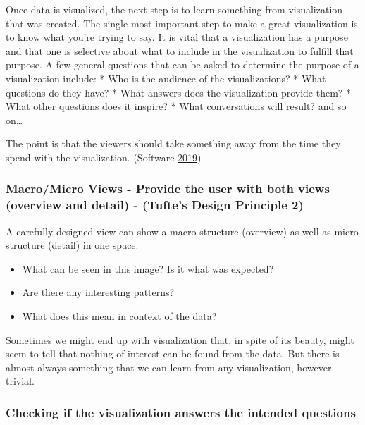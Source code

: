 \documentclass[]{book}
\providecommand{\tightlist}{%
  \setlength{\itemsep}{0pt}\setlength{\parskip}{0pt}}
\begin{document}
Once data is visualized, the next step is to learn something from visualization that was created. The single most important step to make a great visualization is to know what you're trying to say. It is vital that a visualization has a purpose and that one is selective about what to include in the visualization to fulfill that purpose. A few general questions that can be asked to determine the purpose of a visualization include:
* Who is the audience of the visualizations?
* What questions do they have?
* What answers does the visualization provide them?
* What other questions does it inspire?
* What conversations will result? and so on\ldots{}

The point is that the viewers should take something away from the time they spend with the visualization. (Software \protect\hyperlink{ref-analyze_viz}{2019})

\hypertarget{macromicro-views---provide-the-user-with-both-views-overview-and-detail---tuftes-design-principle-2}{%
\subsubsection{Macro/Micro Views - Provide the user with both views (overview and detail) - (Tufte's Design Principle 2)}\label{macromicro-views---provide-the-user-with-both-views-overview-and-detail---tuftes-design-principle-2}}

A carefully designed view can show a macro structure (overview) as well as micro structure (detail) in one space.

\begin{itemize}
\tightlist
\item
  What can be seen in this image? Is it what was expected?
\item
  Are there any interesting patterns?
\item
  What does this mean in context of the data?
\end{itemize}

Sometimes we might end up with visualization that, in spite of its beauty, might seem to tell that nothing of interest can be found from the data. But there is almost always something that we can learn from any visualization, however trivial.

\hypertarget{checking-if-the-visualization-answers-the-intended-questions}{%
\subsubsection{Checking if the visualization answers the intended questions}\label{checking-if-the-visualization-answers-the-intended-questions}}
\end{document}
